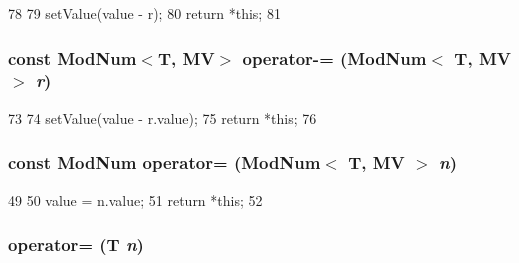 \begin{DoxyCode}
78                                         {
79         setValue(value - r);
80         return *this;
81     }
\end{DoxyCode}
\hypertarget{classModNum_abe043451af83e140341074e14da1cf0b}{
\subsubsection[{operator-\/=}]{\setlength{\rightskip}{0pt plus 5cm}const {\bf ModNum}$<$T, MV$>$ operator-\/= ({\bf ModNum}$<$ T, MV $>$ {\em r})}}
\label{classModNum_abe043451af83e140341074e14da1cf0b}



\begin{DoxyCode}
73                                                     {
74         setValue(value - r.value);
75         return *this;
76     }
\end{DoxyCode}
\hypertarget{classModNum_aa1c55956ddf025b2b6a74d96a11fc4ae}{
\subsubsection[{operator=}]{\setlength{\rightskip}{0pt plus 5cm}const {\bf ModNum} operator= ({\bf ModNum}$<$ T, MV $>$ {\em n})}}
\label{classModNum_aa1c55956ddf025b2b6a74d96a11fc4ae}



\begin{DoxyCode}
49                                      {
50         value = n.value;
51         return *this;
52     }
\end{DoxyCode}
\hypertarget{classModNum_ac9b0ecb5d93cd9ab63c0c4460ef102de}{
\subsubsection[{operator=}]{ operator= (T {\em n})}}
\label{classModNum_ac9b0ecb5d93cd9ab63c0c4460ef102de}



